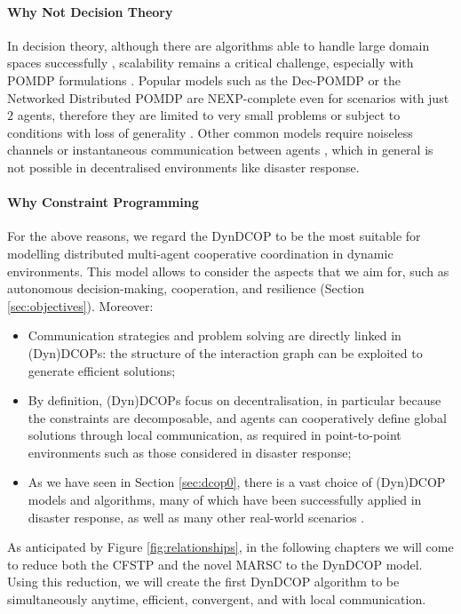 \paragraph{Why Not Decision Theory}

In decision theory, although there are algorithms able to handle large domain spaces
successfully \cite{capitan2013}, scalability remains a critical challenge, especially with
POMDP formulations \cite{seuken2008,amato2013}. Popular models such as the Dec-POMDP
\cite{bernstein2002} or the Networked Distributed POMDP \cite{nair2005nd} are
NEXP-complete even for scenarios with just $2$ agents, therefore they are limited to very
small problems or subject to conditions with loss of generality \cite{kumar2011}. Other
common models require noiseless channels or instantaneous communication between agents
\cite{pynadath2002,nair2004,roth2005}, which in general is not possible in decentralised
environments like disaster response.
\clearpage

\paragraph{Why Constraint Programming}

For the above reasons, we regard the DynDCOP to be the most suitable for modelling
distributed multi-agent cooperative coordination in dynamic environments. This model
allows to consider the aspects that we aim for, such as autonomous decision-making,
cooperation, and resilience (Section \ref{sec:objectives}). Moreover:
\begin{itemize}
    \item Communication strategies and problem solving are directly linked in (Dyn)DCOPs:
        the structure of the interaction graph can be exploited to generate efficient
        solutions;
    \item By definition, (Dyn)DCOPs focus on decentralisation, in particular because the
        constraints are decomposable, and agents can cooperatively define global solutions
        through local communication, as required in point-to-point environments such as
        those considered in disaster response;
    \item As we have seen in Section \ref{sec:dcop0}, there is a vast choice of (Dyn)DCOP
        models and algorithms, many of which have been successfully applied in disaster
        response, as well as many other real-world scenarios
        \cite{cerquides2013,fioretto2018survey,barambones2021survey}.
\end{itemize}
As anticipated by Figure \ref{fig:relationships}, in the following chapters we will come
to reduce both the CFSTP and the novel MARSC to the DynDCOP model.
Using this reduction, we will create the first DynDCOP algorithm to be simultaneously
anytime, efficient, convergent, and with local communication.

